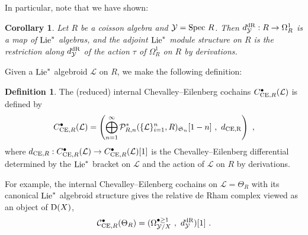 \documentclass[11pt]{amsart}
\numberwithin{equation}{section}
\newtheorem{coro}[theo]{Corollary}
\theoremstyle{definition}
\newtheorem{defn}[theo]{Definition}
\newcommand{\mc}{\mathcal}
\newcommand{\mf}{\mathfrak}
\newcommand{\CE}{{\textup{CE}}}
\newcommand{\Spec}{{\textup{Spec\ }}}
\newcommand{\dR}{{\textup{dR}}}
\newcommand{\Lie}{{\textup{Lie}}}
\newcommand{\Ss}{{{\mf{S}}}}
\newcommand{\0}{{\textbf{0}}}
\newcommand{\Dd}{{\textup{D}}}
\def \mf{\mathfrak}
\begin{document}
In particular, note that we have shown:

\begin{coro}\label{ancmapcoro} Let $R$ be a coisson algebra and $\mc Y=\Spec R$. Then $d_{\mc Y}^\dR:R \to \Omega^1_R$ is a map of $\Lie^*$ algebras, and the adjoint $\Lie^*$ module structure on $R$ is the restriction along $d_{\mc Y}^\dR$ of the action $\tau$ of $\Omega^1_R$ on $R$ by derivations.
\end{coro}

Given a $\Lie^*$ algebroid $\mc L$ on $R$, we make the following definition:

\begin{defn} The (reduced) internal Chevalley--Eilenberg cochains $C^\bullet_{\CE, R}(\mc L)$ is defined by
\[ 
 C^\bullet_{\CE,R}(\mc L) = \left( \bigoplus_{n=1}^\infty   \mc P_{R,n}^*(\{ \mc L\}_{i=1}^n,R)_{\Ss_n}[1-n] \ , \ d_\text{CE,R} \right)  \ , 
\]
where $d_{\CE,R}:C^\bullet_{\CE,R}(\mc L) \to C^\bullet_{\CE,R}(\mc L) [1]$ is the Chevalley--Eilenberg differential determined by the $\Lie^*$ bracket on $\mc L$ and the action of $\mc L$ on $R$ by derivations.
\end{defn}

For example, the internal Chevalley--Eilenberg cochains on $\mc L=\Theta_R$ with its canonical $\Lie^*$ algebroid structure gives the relative de Rham complex viewed as an object of $\Dd(X)$, 
\[ \mc C_{\CE,R}^\bullet(\Theta_R) = ( \Omega^{\bullet\geq 1}_{\mc Y/X}  \ , \ d^\dR_{\mc Y} )[1]  \ .\]
\end{document}
